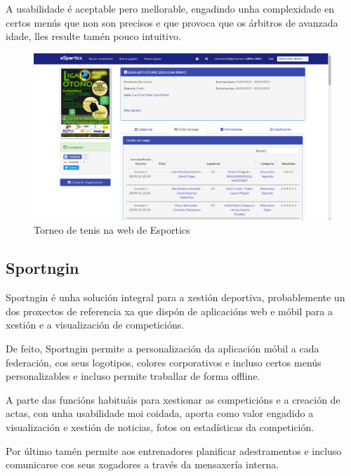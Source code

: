     A usabilidade é aceptable pero mellorable, engadindo unha complexidade en certos 
menús que non son precisos e que provoca que os árbitros de avanzada idade, lles resulte 
tamén pouco intuitivo.

    \begin{figure}[h!]
      \begin{center}
	\includegraphics[width=\textwidth]{./img/esportics-app.png}
	\caption{Torneo de tenis na web de Esportics}
      \end{center}
    \end{figure}

\clearpage

    \subsection{Sportngin}

      
    Sportngin é unha solución integral para a xestión deportiva, probablemente un dos 
proxectos de referencia xa que dispón de aplicacións web e móbil para a xestión e a 
visualización de competicións.

    De feito, Sportngin permite a personalización da aplicación móbil a cada federación, 
cos seus logotipos, colores corporativos e incluso certos menús personalizables 
e incluso permite traballar de forma offline.
    
    A parte das funcións habituáis para xestionar as competicións e a creación de actas, 
con unha usabilidade moi coidada, aporta como valor engadido a visualización e xestión de 
noticias, fotos ou estadísticas da competición.

    Por último tamén permite aos entrenadores planificar adestramentos e incluso 
comunicarse cos seus xogadores a través da mensaxería interna.

